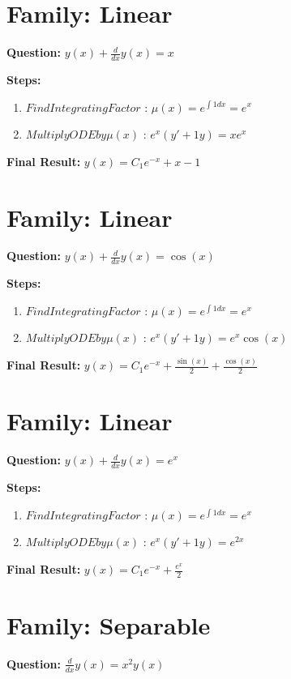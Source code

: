 \documentclass{article}
\begin{document}
\section*{Family: Linear}
\textbf{Question:} $y{\left(x \right)} + \frac{d}{d x} y{\left(x \right)} = x$

\textbf{Steps:}
\begin{enumerate}
\item $Find Integrating Factor$ :  $\mu(x) = e^{\int 1 dx} = e^{x}$
\item $Multiply ODE by \mu(x)$ :  $e^{x}(y' + 1y) = x e^{x}$
\end{enumerate}
\textbf{Final Result:} $y{\left(x \right)} = C_{1} e^{- x} + x - 1$

\section*{Family: Linear}
\textbf{Question:} $y{\left(x \right)} + \frac{d}{d x} y{\left(x \right)} = \cos{\left(x \right)}$

\textbf{Steps:}
\begin{enumerate}
\item $Find Integrating Factor$ :  $\mu(x) = e^{\int 1 dx} = e^{x}$
\item $Multiply ODE by \mu(x)$ :  $e^{x}(y' + 1y) = e^{x} \cos{\left(x \right)}$
\end{enumerate}
\textbf{Final Result:} $y{\left(x \right)} = C_{1} e^{- x} + \frac{\sin{\left(x \right)}}{2} + \frac{\cos{\left(x \right)}}{2}$

\section*{Family: Linear}
\textbf{Question:} $y{\left(x \right)} + \frac{d}{d x} y{\left(x \right)} = e^{x}$

\textbf{Steps:}
\begin{enumerate}
\item $Find Integrating Factor$ :  $\mu(x) = e^{\int 1 dx} = e^{x}$
\item $Multiply ODE by \mu(x)$ :  $e^{x}(y' + 1y) = e^{2 x}$
\end{enumerate}
\textbf{Final Result:} $y{\left(x \right)} = C_{1} e^{- x} + \frac{e^{x}}{2}$

\section*{Family: Separable}
\textbf{Question:} $\frac{d}{d x} y{\left(x \right)} = x^{2} y{\left(x \right)}$
\end{document}

